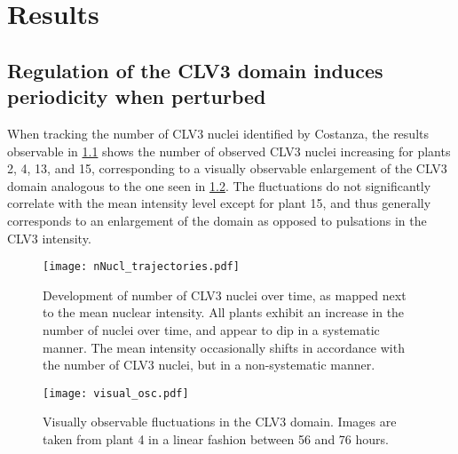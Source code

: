 
\chapter{Results}

\ifpdf
    \graphicspath{{Chapter3/Figs/Raster/}{Chapter3/Figs/PDF/}{Chapter3/Figs/}}
\else
    \graphicspath{{Chapter3/Figs/Vector/}{Chapter3/Figs/}}
\fi

\section{Regulation of the CLV3 domain induces periodicity when perturbed}
When tracking the number of CLV3 nuclei identified by Costanza, the results
observable in \cref{fig:clv3_trajs} shows the number of observed CLV3 nuclei
increasing for plants 2, 4, 13, and 15, corresponding to a visually observable
enlargement of the CLV3 domain analogous to the one seen in
\cref{fig:visual_osc}. The fluctuations do not significantly correlate with the
mean intensity level except for plant 15, and thus generally corresponds to an
enlargement of the domain as opposed to pulsations in the CLV3 intensity.

\begin{figure}[H]
  \centering
  \texttt{[image: nNucl\_trajectories.pdf]}
  \caption[Number of CLV3 nuclei over time]{Development of number of CLV3 nuclei
    over time, as mapped next to the mean nuclear intensity. All plants exhibit
    an increase in the number of nuclei over time, and appear to dip in a
    systematic manner. The mean intensity occasionally shifts in accordance with
    the number of CLV3 nuclei, but in a non-systematic manner.}
  \label{fig:clv3_trajs}
\end{figure}

\begin{figure}[H]
  \centering
  \texttt{[image: visual\_osc.pdf]}
  \caption[Raw image CLV3 domain fluctuations]{Visually observable fluctuations
    in the CLV3 domain. Images are taken from plant 4 in a linear fashion
    between 56 and 76 hours.}
  \label{fig:visual_osc}
\end{figure}

